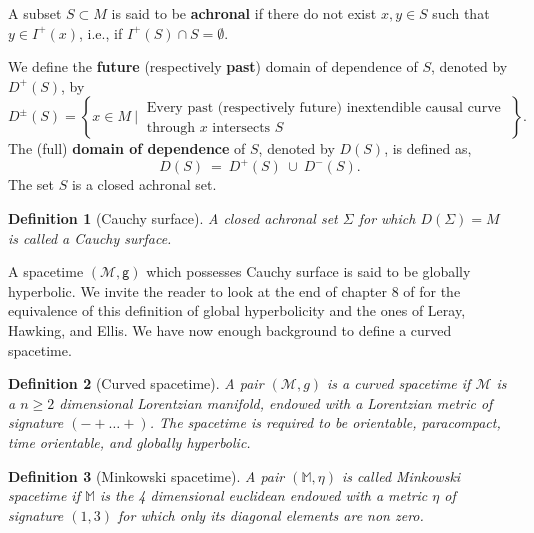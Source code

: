 \documentclass[10pt]{book}
\newcommand{\Mcal}{\mathcal{M}}
\newcommand{\Mbb}{\mathbb{M}}
\newcommand{\gsf}{\mathsf{g}}
\theoremstyle{break}
\newtheorem{definition}{Definition}
\begin{document}
\bigskip


A subset $S \subset M$ is said to be \textbf{achronal} if there do not exist $x, y \in S$ such that $y \in I^{+}(x)$, i.e., if $I^{+}(S) \cap S = \emptyset$. 


\bigskip


We define the \textbf{future} (respectively \textbf{past}) domain of dependence of $S$, denoted by $D^{+}(S)$, by
%
\begin{equation*}
D^{\pm}(S) = \left\{ x \in M \ \bigg| \ \begin{array}{l} \text{Every past (respectively future) inextendible causal curve} \\ \text{through $x$ intersects $S$} \end{array} \; \right\}.
\end{equation*}
%
The (full) \textbf{domain of dependence} of $S$, denoted by $D(S)$, is defined as,
\begin{equation*}
D(S) \ = \ D^{+}(S) \ \cup \ D^{-}(S).
\end{equation*}
The set $S$ is a closed achronal set.


\bigskip


\begin{definition}[Cauchy surface]
A closed achronal set $\Sigma$ for which $D(\Sigma) = M$ is called a Cauchy surface. 
\end{definition}

A spacetime $(\Mcal,\gsf)$ which possesses Cauchy surface is said to be globally hyperbolic. We invite the reader to look at the end of chapter $8$ of \cite{waldGR} for the equivalence of this definition of global hyperbolicity and the ones of Leray, Hawking, and Ellis. 
We have now enough background to define a curved spacetime.

\begin{definition}[Curved spacetime]\label{def:CST}
A pair $(\Mcal,g)$ is a curved spacetime if $\Mcal$ is a $n \geq 2$ dimensional Lorentzian manifold, endowed with a Lorentzian metric of signature $( - + \dots +)$. The spacetime is required to be orientable, paracompact, time orientable, and globally hyperbolic. 
\end{definition}


\begin{definition}[Minkowski spacetime]
A pair $(\Mbb,\eta)$ is called Minkowski spacetime if $\Mbb$ is the 4 dimensional euclidean endowed with a metric $\eta$ of signature $(1,3)$ for which only its diagonal elements are non zero.
\end{definition}
\end{document}
